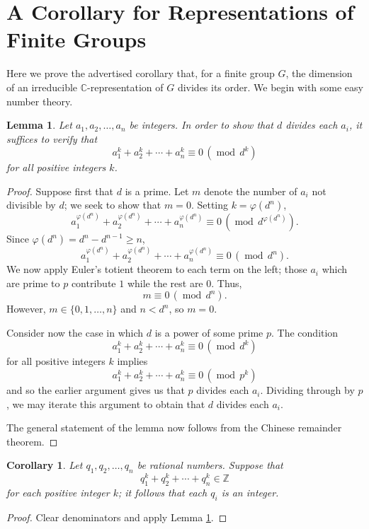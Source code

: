 \documentclass[12pt]{article}
\newtheorem{cor}[thm]{Corollary}
\newtheorem{lem}[thm]{Lemma}
\newcommand{\con}{\equiv}
\newcommand{\Mod}[1]{\,(\operatorname{mod}\, #1)}
\newcommand{\be}{\begin{equation}}
\newcommand{\ee}{\end{equation}}
\begin{document}
\section{A Corollary for Representations of Finite Groups}
Here we prove the advertised corollary that, for a finite group $G$, the dimension of an irreducible $\mathbb{C}$-representation of $G$ divides its order.  We begin with some easy number theory.
\begin{lem}\label{divisorsold}
Let $a_1, a_2, \ldots, a_n$ be integers.  In order to show that $d$ divides each $a_i$, it suffices to verify that
\be\label{duh}
a_1^k + a_2^k + \cdots + a_n^k \con 0 \Mod{d^k}
\ee
for all positive integers $k$.
\end{lem}
\begin{proof}
Suppose first that $d$ is a prime.  Let $m$ denote the number of $a_i$ not divisible by $d$; we seek to show that $m=0$.  Setting $k=\varphi(d^n)$, 
\be
a_1^{\varphi (d^n)} + a_2^{\varphi (d^n)} + \cdots+  a_n^{\varphi (d^n)} \con 0 \Mod{d^{\varphi (d^n)}}.
\ee
Since $\varphi (d^n) = d^n - d^{n-1} \geq n$,
\be
a_1^{\varphi (d^n)} + a_2^{\varphi (d^n)} + \cdots+  a_n^{\varphi (d^n)} \con 0 \Mod{d^{n}}.
\ee
We now apply Euler's totient theorem to each term on the left; those $a_i$ which are prime to $p$ contribute $1$ while the rest are $0$.  Thus,
\be
m \con 0 \Mod{d^{n}}.
\ee
However, $m \in \{0,1,\ldots, n\}$ and $n < d^n$, so $m=0$.

Consider now the case in which $d$ is a power of some prime $p$.  The condition
\be
a_1^k + a_2^k + \cdots + a_n^k \con 0 \Mod{d^k}
\ee
for all positive integers $k$ implies
\be
a_1^k + a_2^k + \cdots + a_n^k \con 0 \Mod{p^k}
\ee
and so the earlier argument gives us that $p$ divides each $a_i$.  Dividing through by $p$, we may iterate this argument to obtain that $d$ divides each $a_i$.

The general statement of the lemma now follows from the Chinese remainder theorem.
\end{proof}
\begin{cor}\label{divisors}
Let $q_1, q_2, \ldots , q_n$ be rational numbers.  Suppose that
\be
q_1^k + q_2^k + \cdots +  q_n^k \in \mathbb{Z}
\ee
for each positive integer $k$; it follows that each $q_i$ is an integer.
\end{cor}
\begin{proof}
Clear denominators and apply Lemma \ref{divisorsold}.
\end{proof}
\end{document}

